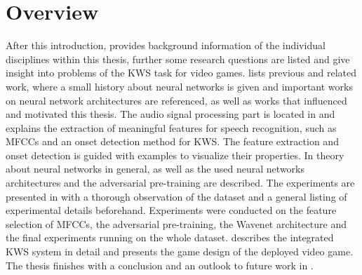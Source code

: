 
\section{Overview}\label{sec:intro_overview}
After this introduction,  provides background information of the individual disciplines within this thesis, further some research questions are listed and give insight into problems of the KWS task for video games.
 lists previous and related work, where a small history about neural networks is given and important works on neural network architectures are referenced, as well as works that influenced and motivated this thesis.
The audio signal processing part is located in  and explains the extraction of meaningful features for speech recognition, such as MFCCs and an onset detection method for KWS.
The feature extraction and onset detection is guided with examples to visualize their properties.
In  theory about neural networks in general, as well as the used neural networks architectures and the adversarial pre-training are described.
The experiments are presented in  with a thorough observation of the dataset and a general listing of experimental details beforehand. 
Experiments were conducted on the feature selection of MFCCs, the adversarial pre-training, the Wavenet architecture and the final experiments running on the whole dataset.
 describes the integrated KWS system in detail and presents the game design of the deployed video game.
The thesis finishes with a conclusion and an outlook to future work in .